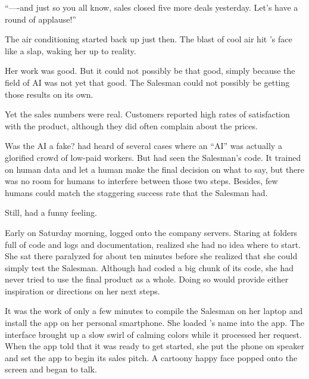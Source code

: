 ``----and just so you all know, sales closed five more deals yesterday. Let's have a round of applause!''

The air conditioning started back up just then. The blast of cool air hit {\protag}'s face like a slap, waking her up to reality.

Her work was good. But it could not possibly be that good, simply because the field of AI was not yet that good. The Salesman could not possibly be getting those results on its own.

Yet the sales numbers were real. Customers reported high rates of satisfaction with the product, although they did often complain about the prices.


Was the AI a fake? {\protag} had heard of several cases where an ``AI'' was actually a glorified crowd of low-paid workers. But {\protag} had seen the Salesman's code. It trained on human data and let a human make the final decision on what to say, but there was no room for humans to interfere between those two steps. Besides, few humans could match the staggering success rate that the Salesman had.

Still, {\protag} had a funny feeling.



Early on Saturday morning, {\protag} logged onto the company servers. Staring at folders full of code and logs and documentation, {\protag} realized she had no idea where to start.  She sat there paralyzed for about ten minutes before she realized that she could simply test the Salesman. Although {\protag} had coded a big chunk of its code, she had never tried to use the final product as a whole. Doing so would provide either inspiration or directions on her next steps.

It was the work of only a few minutes to compile the Salesman on her laptop and install the app on her personal smartphone. She loaded {\sidetag}'s name into the app. The interface brought up a slow swirl of calming colors while it processed her request. When the app told {\protag} that it was ready to get started, she put the phone on speaker and set the app to begin its sales pitch. A cartoony happy face popped onto the screen and began to talk.

